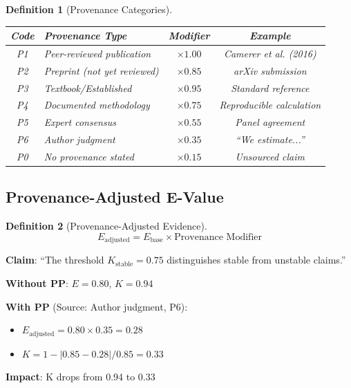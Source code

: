 \documentclass[11pt,a4paper]{article}
\newtheorem{definition}{Definition}[section]
\theoremstyle{remark}
\begin{document}
\begin{definition}[Provenance Categories]
\label{def:pp}
\begin{center}
\begin{tabular}{clcc}
\toprule
\textbf{Code} & \textbf{Provenance Type} & \textbf{Modifier} & \textbf{Example} \\
\midrule
P1 & Peer-reviewed publication & $\times 1.00$ & Camerer et al. (2016) \\
P2 & Preprint (not yet reviewed) & $\times 0.85$ & arXiv submission \\
P3 & Textbook/Established & $\times 0.95$ & Standard reference \\
P4 & Documented methodology & $\times 0.75$ & Reproducible calculation \\
P5 & Expert consensus & $\times 0.55$ & Panel agreement \\
P6 & Author judgment & $\times 0.35$ & ``We estimate...'' \\
P0 & No provenance stated & $\times 0.15$ & Unsourced claim \\
\bottomrule
\end{tabular}
\end{center}
\end{definition}

\subsection{Provenance-Adjusted E-Value}

\begin{definition}[Provenance-Adjusted Evidence]
\label{def:pp-adjusted}
\begin{equation}
E_{\text{adjusted}} = E_{\text{base}} \times \text{Provenance Modifier}
\end{equation}
\end{definition}

\begin{examplebox}[title={Provenance Impact}]
\textbf{Claim}: ``The threshold $K_{\text{stable}} = 0.75$ distinguishes stable from unstable claims.''

\textbf{Without PP}: $E = 0.80$, $K = 0.94$

\textbf{With PP} (Source: Author judgment, P6):
\begin{itemize}
    \item $E_{\text{adjusted}} = 0.80 \times 0.35 = 0.28$
    \item $K = 1 - |0.85 - 0.28|/0.85 = 0.33$
\end{itemize}

\textbf{Impact}: K drops from 0.94 to 0.33
\end{examplebox}
\end{document}
